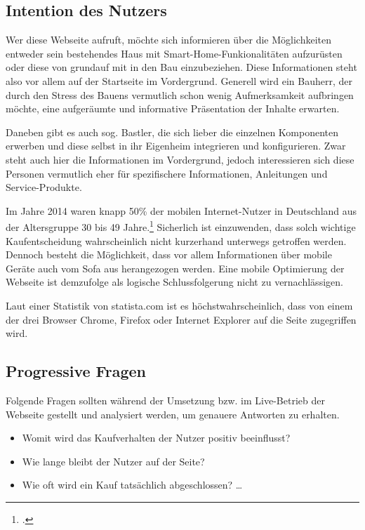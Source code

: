 \subsection{Intention des Nutzers}
Wer diese Webseite aufruft, möchte sich informieren über die Möglichkeiten entweder sein bestehendes Haus mit Smart-Home-Funkionalitäten aufzurüsten oder diese von grundauf mit in den Bau einzubeziehen. Diese Informationen steht also vor allem auf der Startseite im Vordergrund. Generell wird ein Bauherr, der durch den Stress des Bauens vermutlich schon wenig Aufmerksamkeit aufbringen möchte, eine aufgeräumte und informative Präsentation der Inhalte erwarten.

Daneben gibt es auch sog. Bastler, die sich lieber die einzelnen Komponenten erwerben und diese selbst in ihr Eigenheim integrieren und konfigurieren. Zwar steht auch hier die Informationen im Vordergrund, jedoch interessieren sich diese Personen vermutlich eher für spezifischere Informationen, Anleitungen und Service-Produkte.

Im Jahre 2014 waren knapp 50\% der mobilen Internet-Nutzer in Deutschland aus der Altersgruppe 30 bis 49 Jahre.\footcite[vgl.][]{statista:alter} Sicherlich ist einzuwenden, dass solch wichtige Kaufentscheidung wahrscheinlich nicht kurzerhand unterwegs getroffen werden. Dennoch besteht die Möglichkeit, dass vor allem Informationen über mobile Geräte auch vom Sofa aus herangezogen werden. Eine mobile Optimierung der Webseite ist demzufolge als logische Schlussfolgerung nicht zu vernachlässigen. 

Laut einer Statistik von statista.com ist es höchstwahrscheinlich, dass von einem der drei Browser Chrome, Firefox oder Internet Explorer auf die Seite zugegriffen wird. 

\subsection{Progressive Fragen}
Folgende Fragen sollten während der Umsetzung bzw. im Live-Betrieb der Webseite gestellt und analysiert werden, um genauere Antworten zu erhalten.
\begin{itemize}
	\item Womit wird das Kaufverhalten der Nutzer positiv beeinflusst? 
	\item Wie lange bleibt der Nutzer auf der Seite? 
	\item Wie oft wird ein Kauf tatsächlich abgeschlossen? \ldots
\end{itemize}

